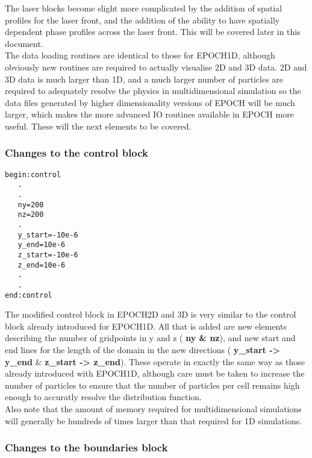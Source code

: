 \documentclass[12pt]{article}
\newcommand{\inlineemph}{\color{warwicklight} \bf}
\newcommand{\boxverbatim}[1]{\begin{Verbatim}[obeytabs=true,frame=single,
  framerule=0.5mm,rulecolor=\color{warwickmid},label=#1]}
\newcommand{\EPOCH}{{\color{warwickdark}\fontfamily{phv}\selectfont EPOCH} }
\begin{document}
The laser blocks become slight more complicated by the addition of spatial
profiles for the laser front, and the addition of the ability to have spatially
dependent phase profiles across the laser front. This will be covered later in
this document.\\

The data loading routines are identical to those for EPOCH1D, although
obviously new routines are required to actually visualise 2D and 3D data. 2D
and 3D data is much larger than 1D, and a much larger number of particles are
required to adequately resolve the physics in multidimensional simulation so
the data files generated by higher dimensionality versions of EPOCH will be
much larger, which makes the more advanced IO routines available in \EPOCH more
useful. These will the next elements to be covered.\\

\subsubsection{Changes to the {\inlineemph control} block}

\boxverbatim{Changed control block}
begin:control
   .
   .
   ny=200
   nz=200
   .
   y_start=-10e-6
   y_end=10e-6
   z_start=-10e-6
   z_end=10e-6
   .
   .
end:control
\end{Verbatim}

The modified control block in EPOCH2D and 3D is very similar to the control
block already introduced for EPOCH1D. All that is added are new elements
describing the number of gridpoints in y and z ({\inlineemph ny \& nz}), and
new start and end lines for the length of the domain in the new directions
({\inlineemph y\_start -> y\_end} \& {\inlineemph z\_start -> z\_end}). These
operate in exactly the same way as those already introduced with EPOCH1D,
although care must be taken to increase the number of particles to ensure that
the number of particles per cell remains high enough to accuratly resolve the
distribution function.\\

Also note that the amount of memory required for multidimensional simulations
will generally be hundreds of times larger than that required for 1D
simulations.\\

\subsubsection{Changes to the {\inlineemph boundaries} block}
\end{document}
